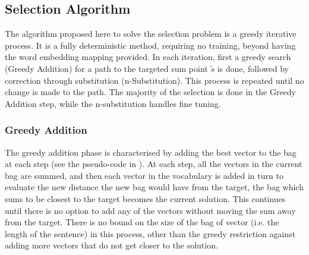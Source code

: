 \documentclass{llncs}
\newcommand{\s}{\tilde{s}}
\newcommand{\V}{\mathcal{V}}
\begin{document}
\begin{comment}
\subsection{Limitations of the Vector Selection Problem}
Solving the vector selection problem optimally will find the set of vectors from $V$ that sum to be the closest point in SOWE space to the target $\s$. Note that the SOWE space is not the vector space $\mathbb{R}^n$, it is only the monoid generated by $V$. If $\s$ was created by a noisy process that approximates the SOWE for a particular sentence, then it is possible that the error in its creation may cause $\s$ to be located closer to an incorrect point in that monoid, than to the correct point. This would of-course mean that solving the vector selection problem would not find the targeted sentence. One method to combat this would be ignore points in the SOWE space generated by sums of very large numbers of word vectors. This is equivalent to setting an upper bound on $\sum_{0\le j \le |\V|}c_j$, i.e. on the length of the sentence. Performance under such noise is not evaluated in this work.
\end{comment}


\subsection{Selection Algorithm}
The algorithm proposed here to solve the selection problem is a greedy iterative process. It is a fully deterministic method, requiring no training, beyond having the word embedding mapping provided. In each iteration, first a greedy search (Greedy Addition) for a path to the targeted sum point $\s$ is done, followed by correction through substitution (n-Substitution). This process is repeated until no change is made to the path. The majority of the selection is done in the Greedy Addition step, while the n-substitution handles fine tuning. 

\subsubsection{Greedy Addition}
The greedy addition phase is characterised by adding the best vector to the bag at each step (see the pseudo-code in ). At each step, all the vectors in the current bag are summed, and then each vector in the vocabulary is added in turn to evaluate the new distance the new bag would have from the target, the bag which sums to be closest to the target  becomes the current solution. This continues until there is no option to add any of the vectors without moving the sum away from the target. There is no bound on the size of the bag of vector (i.e. the length of the sentence) in this process, other than the greedy restriction against adding more vectors that do not get closer to the solution.
\end{document}
